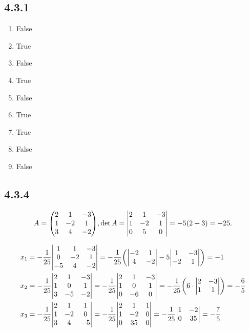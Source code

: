 \documentclass[12pt,titlepage]{extarticle}
\begin{document}
\subsection*{4.3.1}
\begin{enumerate}[label=\alph*)]
    \item False
    \item True
    \item False
    \item True
    \item False
    \item True
    \item True
    \item False
    \item False
\end{enumerate}

\subsection*{4.3.4}
\[
    A = \mqty(
        2 & 1  & -3 \\
        1 & -2 & 1 \\
        3 & 4  & -2
    ), \det A = \mqty|
        2 & 1  & -3 \\
        1 & -2 & 1 \\
        0 & 5  & 0
    | = -5(2 + 3) = -25
.\]

\begin{align*}
    x_1 &= -\frac{1}{25} \mqty|
        1  & 1  & -3 \\
        0  & -2 & 1 \\
        -5 & 4  & -2
    | = -\frac{1}{25}\qty(
    \mqty|
        -2 & 1 \\
        4 & -2
    | - 5 \mqty|
        1 & -3 \\
        -2 & 1
    |
    ) = -1 \\
    x_2 &= -\frac{1}{25} \mqty|
        2 & 1  & -3 \\
        1 & 0 & 1 \\
        3 & -5  & -2
    | = -\frac{1}{25} \mqty|
        2 & 1  & -3 \\
        1 & 0 & 1 \\
        0 & -6  & 0
    | = -\frac{1}{25} \qty(
    6 \cdot \mqty|
        2 & -3 \\
        1 & 1
    |
    ) = -\frac{6}{5} \\
    x_3 &= -\frac{1}{25} \mqty|
        2 & 1  & 1 \\
        1 & -2 & 0 \\
        3 & 4  & -5
    | = -\frac{1}{25} \mqty|
        2 & 1  & 1 \\
        1 & -2 & 0 \\
        0 & 35  & 0
    | = -\frac{1}{25} \mqty|
        1 & -2 \\
        0 & 35
    | = -\frac{7}{5}
\end{align*}
\end{document}
